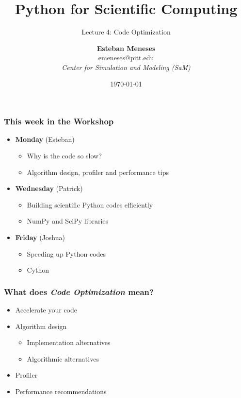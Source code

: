 \documentclass[xcolor=table,10pt,final]{beamer}
\begin{document}
\lstset{language=Python}

\title{Python for Scientific Computing}
\subtitle{Lecture 4: Code Optimization}
\author{{\bf Esteban Meneses}\\emeneses@pitt.edu\\{\em Center for Simulation and Modeling (SaM)}}
\date{\today}
\frame{\titlepage}

\ifx \audience \undefined
\begin{frame}
	\frametitle{This week in the Workshop}
	\begin{itemize}
		\item {\bf Monday} (Esteban)
		\begin{itemize} 
			\item Why is the code so slow?
			\item Algorithm design, profiler and performance tips
		\end{itemize}
		\item {\bf Wednesday} (Patrick)
		\begin{itemize} 
			\item Building scientific Python codes efficiently 
			\item NumPy and SciPy libraries
		\end{itemize}
		\item {\bf Friday} (Joshua)
		\begin{itemize} 
			\item Speeding up Python codes
			\item Cython
		\end{itemize}
	\end{itemize}
\end{frame}
\else
\fi

\begin{frame}
	\frametitle{What does \emph{Code Optimization} mean?}
			\begin{itemize}
				\item Accelerate your code
				\item Algorithm design
				\begin{itemize}
					\item Implementation alternatives
					\item Algorithmic alternatives
				\end{itemize}
				\item Profiler
				\item Performance recommendations
			\end{itemize}
\end{frame}
\end{document}
